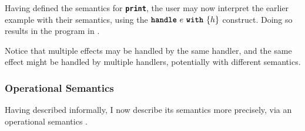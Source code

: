

% 
Having defined the semantics for \textbf{\texttt{print}}, the user may now interpret the earlier example with their semantics, using the $\textbf{\texttt{handle}} \,\, {e} \,\, \textbf{\texttt{with}} \,\, \{{h}\}$ construct. Doing so results in the program in .

Notice that multiple effects may be handled by the same handler, and the same effect might be handled by multiple handlers, potentially with different semantics. 

\subsubsection{Operational Semantics}
Having described \efflang{} informally, I now describe its semantics more precisely, via an operational semantics . 

